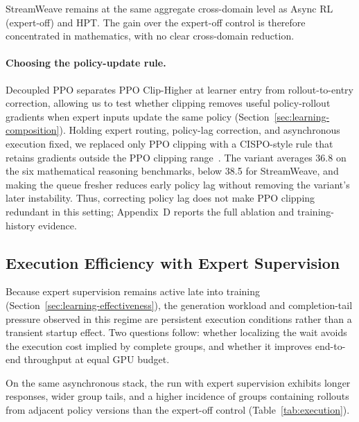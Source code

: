 \documentclass[letterpaper]{article}
\begin{document}
StreamWeave remains at the same aggregate cross-domain level as Async RL (expert-off) and HPT.
The gain over the expert-off control is therefore concentrated in mathematics, with no clear cross-domain reduction.

\paragraph{Choosing the policy-update rule.}
Decoupled PPO separates PPO Clip-Higher at learner entry from rollout-to-entry correction, allowing us to test whether clipping removes useful policy-rollout gradients when expert inputs update the same policy (Section~\ref{sec:learning-composition}).
Holding expert routing, policy-lag correction, and asynchronous execution fixed, we replaced only PPO clipping with a CISPO-style rule that retains gradients outside the PPO clipping range~\citep{minimax2025m1}.
The variant averages 36.8 on the six mathematical reasoning benchmarks, below 38.5 for StreamWeave, and making the queue fresher reduces early policy lag without removing the variant's later instability.
Thus, correcting policy lag does not make PPO clipping redundant in this setting; Appendix~D reports the full ablation and training-history evidence.

\subsection{Execution Efficiency with Expert Supervision}
\label{sec:execution-efficiency}

Because expert supervision remains active late into training (Section~\ref{sec:learning-effectiveness}), the generation workload and completion-tail pressure observed in this regime are persistent execution conditions rather than a transient startup effect.
Two questions follow: whether localizing the wait avoids the execution cost implied by complete groups, and whether it improves end-to-end throughput at equal GPU budget.

On the same asynchronous stack, the run with expert supervision exhibits longer responses, wider group tails, and a higher incidence of groups containing rollouts from adjacent policy versions than the expert-off control (Table~\ref{tab:execution}).
\end{document}
